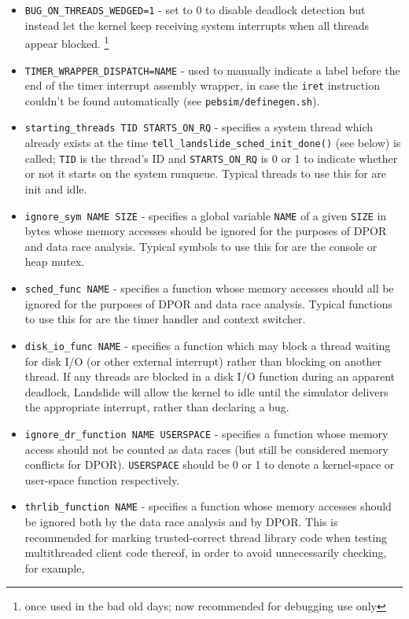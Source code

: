 \begin{itemize}
	\item {\tt BUG\_ON\_THREADS\_WEDGED=1} - set to 0 to disable deadlock detection but instead let the kernel keep receiving system interrupts when all threads appear blocked.%
		\footnote{once used in the bad old days; now recommended for debugging use only}
	\item {\tt TIMER\_WRAPPER\_DISPATCH=NAME} - used to manually indicate a label before the end of the timer interrupt assembly wrapper, in case the {\tt iret} instruction couldn't be found automatically (see {\tt pebsim/definegen.sh}).
	\item {\tt starting\_threads TID STARTS\_ON\_RQ} - specifies a system thread which already exists at the time {\tt tell\_landslide\_sched\_init\_done()} (see below) is called; {\tt TID} is the thread's ID and {\tt STARTS\_ON\_RQ} is 0 or 1 to indicate whether or not it starts on the system runqueue.
		Typical threads to use this for are init and idle.
	\item {\tt ignore\_sym NAME SIZE} - specifies a global variable {\tt NAME} of a given {\tt SIZE} in bytes whose memory accesses should be ignored for the purposes of DPOR and data race analysis.
		Typical symbols to use this for are the console or heap mutex.
	\item {\tt sched\_func NAME} - specifies a function whose memory accesses should all be ignored for the purposes of DPOR and data race analysis.
		Typical functions to use this for are the timer handler and context switcher.
	\item {\tt disk\_io\_func NAME} - specifies a function which may block a thread waiting for disk I/O (or other external interrupt) rather than blocking on another thread.
		If any threads are blocked in a disk I/O function during an apparent deadlock,
		Landslide will allow the kernel to idle until the simulator delivers the appropriate interrupt,
		rather than declaring a bug.
	\item {\tt ignore\_dr\_function NAME USERSPACE} - specifies a function whose memory access should not be counted as data races (but still be considered memory conflicts for DPOR).
		{\tt USERSPACE} should be 0 or 1 to denote a kernel-space or user-space function respectively.
	\item {\tt thrlib\_function NAME} - specifies a function whose memory accesses should be ignored both by the data race analysis and by DPOR.
		This is recommended for marking trusted-correct thread library code when testing multithreaded client code thereof,
		in order to avoid unnecessarily checking, for example,

\end{itemize}
